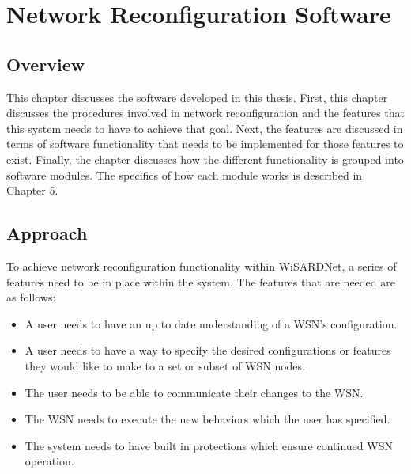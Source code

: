 
\chapter{Network Reconfiguration Software} %
\label{Chapter 4}
\lhead{} %

\section{Overview}
This chapter discusses the software developed in this thesis. First, this chapter discusses the procedures involved in network reconfiguration and the features that this system needs to have to achieve that goal. Next, the features are discussed in terms of software functionality that needs to be implemented for those features to exist. Finally, the chapter discusses how the different functionality is grouped into software modules. The specifics of how each module works is described in Chapter 5.



\section{Approach}
To achieve network reconfiguration functionality within WiSARDNet, a series of features need to be in place within the system. The features that are needed are as follows:

\begin{itemize}
	\item A user needs to have an up to date understanding of a WSN's configuration.
	\item A user needs to have a way to specify the desired configurations or features they would like to make to a set or subset of WSN nodes.
	\item The user needs to be able to communicate their changes to the WSN. 
	\item The WSN needs to execute the new behaviors which the user has specified.
	\item The system needs to have built in protections which ensure continued WSN operation.
\end{itemize} 

